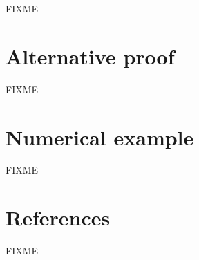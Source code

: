 \documentclass[a4paper]{article}
\begin{document}
FIXME

\section{Alternative proof}


FIXME

\section{Numerical example}


FIXME

\section{References}

FIXME
\end{document}
